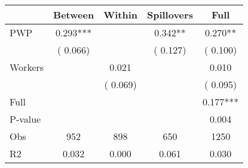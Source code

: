 
\begin{tabular}{l*{4}{c}}\hline&\multicolumn{1}{c}{Between}&\multicolumn{1}{c}{Within}&\multicolumn{1}{c}{Spillovers}&\multicolumn{1}{c}{Full}\\ \hline
 PWP           &              0.293***      &                                               &        0.342** &         0.270**                            \\ 
                               &        (       0.066)           &                                       &       (       0.127)     &      (       0.100)                                           \\ 
 Workers       &                                               &        0.021    &                                &             0.010                            \\ 
                               &                                               & (       0.069)                  &                                        &      (       0.095)                                           \\ 
\hline                                                                                                                                                                                                                                            
 Full                  &                                               &                                               &                                        &             0.177***                                     \\ 
 P-value               &                                               &                                               &                                        &             0.004                                           \\ 
 Obs                   &               952               &       898                       &       650                &              1250                                               \\ 
 R2                    &                      0.032              &              0.000                      &              0.061               &                     0.030                                              \\ 
\hline \end{tabular}                                                                                                                                                                                                              